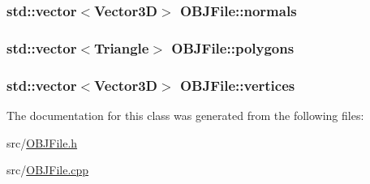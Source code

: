 \subsubsection[{\texorpdfstring{normals}{normals}}]{\setlength{\rightskip}{0pt plus 5cm}std\+::vector$<${\bf Vector3D}$>$ O\+B\+J\+File\+::normals\hspace{0.3cm}{\ttfamily [private]}}\hypertarget{classOBJFile_a287bef6fc146d20df4585d103b226eec}{}\label{classOBJFile_a287bef6fc146d20df4585d103b226eec}
\subsubsection[{\texorpdfstring{polygons}{polygons}}]{\setlength{\rightskip}{0pt plus 5cm}std\+::vector$<${\bf Triangle}$>$ O\+B\+J\+File\+::polygons\hspace{0.3cm}{\ttfamily [private]}}\hypertarget{classOBJFile_a7d568b98c43fd96142d9f0f0e57b296e}{}\label{classOBJFile_a7d568b98c43fd96142d9f0f0e57b296e}
\subsubsection[{\texorpdfstring{vertices}{vertices}}]{\setlength{\rightskip}{0pt plus 5cm}std\+::vector$<${\bf Vector3D}$>$ O\+B\+J\+File\+::vertices\hspace{0.3cm}{\ttfamily [private]}}\hypertarget{classOBJFile_a9b07010eef35e7d44250f5f4f8fa3428}{}\label{classOBJFile_a9b07010eef35e7d44250f5f4f8fa3428}


The documentation for this class was generated from the following files\+:\begin{DoxyCompactItemize}
\item 
src/\hyperlink{OBJFile_8h}{O\+B\+J\+File.\+h}\item 
src/\hyperlink{OBJFile_8cpp}{O\+B\+J\+File.\+cpp}\end{DoxyCompactItemize}
